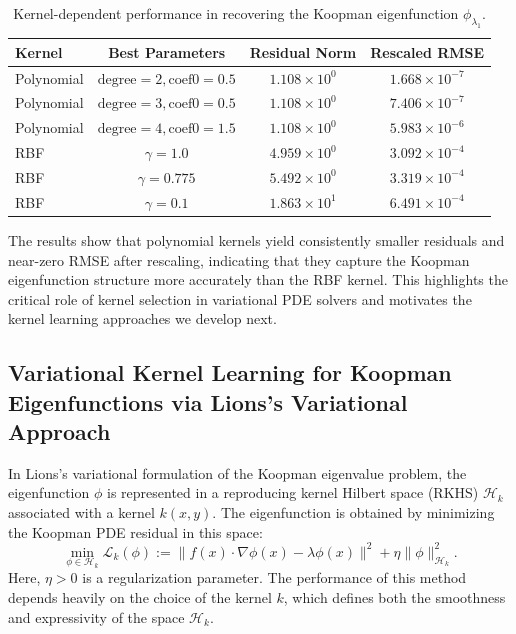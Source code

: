\documentclass[11pt]{article}
\theoremstyle{plain}
\def\[{\begin{equation}}
\def\]{\end{equation}}
\begin{document}
\begin{table}[h!]
\centering
\begin{tabular}{|l|c|c|c|}
\hline
\textbf{Kernel} & \textbf{Best Parameters} & \textbf{Residual Norm} & \textbf{Rescaled RMSE} \\
\hline
Polynomial & \( \text{degree}=2, \text{coef0}=0.5 \) & \( 1.108 \times 10^0 \) & \( 1.668 \times 10^{-7} \) \\
Polynomial & \( \text{degree}=3, \text{coef0}=0.5 \) & \( 1.108 \times 10^0 \) & \( 7.406 \times 10^{-7} \) \\
Polynomial & \( \text{degree}=4, \text{coef0}=1.5 \) & \( 1.108 \times 10^0 \) & \( 5.983 \times 10^{-6} \) \\
RBF        & \( \gamma = 1.0 \)                       & \( 4.959 \times 10^0 \) & \( 3.092 \times 10^{-4} \) \\
RBF        & \( \gamma = 0.775 \)                     & \( 5.492 \times 10^0 \) & \( 3.319 \times 10^{-4} \) \\
RBF        & \( \gamma = 0.1 \)                       & \( 1.863 \times 10^1 \) & \( 6.491 \times 10^{-4} \) \\
\hline
\end{tabular}
\caption{Kernel-dependent performance in recovering the Koopman eigenfunction \( \phi_{\lambda_1} \).}
\end{table}



The results show that polynomial kernels yield consistently smaller residuals and near-zero RMSE after rescaling, indicating that they capture the Koopman eigenfunction structure more accurately than the RBF kernel. This highlights the critical role of kernel selection in variational PDE solvers and motivates the kernel learning approaches we develop next.

 
\subsection{Variational Kernel Learning for Koopman Eigenfunctions via Lions’s Variational Approach}

In Lions’s variational formulation of the Koopman eigenvalue problem, the eigenfunction $\phi$ is represented in a reproducing kernel Hilbert space (RKHS) $\mathcal{H}_k$ associated with a kernel $k(x, y)$. The eigenfunction is obtained by minimizing the Koopman PDE residual in this space:
\[
\min_{\phi \in \mathcal{H}_k} \mathcal{L}_k(\phi) := \| f(x) \cdot \nabla \phi(x) - \lambda \phi(x) \|^2 + \eta \|\phi\|^2_{\mathcal{H}_k}.
\]
Here, $\eta > 0$ is a regularization parameter. The performance of this method depends heavily on the choice of the kernel $k$, which defines both the smoothness and expressivity of the space $\mathcal{H}_k$.
\end{document}

